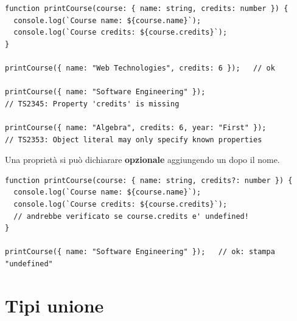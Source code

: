 \begin{affianco}[0.6][c]
\codicepiccolo
\begin{lstlisting}[style=ts, name=object_types.ts]
function printCourse(course: { name: string, credits: number }) {
  console.log(`Course name: ${course.name}`);
  console.log(`Course credits: ${course.credits}`);
}

printCourse({ name: "Web Technologies", credits: 6 });   // ok

printCourse({ name: "Software Engineering" });
// TS2345: Property 'credits' is missing

printCourse({ name: "Algebra", credits: 6, year: "First" });
// TS2353: Object literal may only specify known properties
\end{lstlisting}
\risultato
\begin{immagine}
\end{immagine}
\end{affianco}

Una proprietà si può dichiarare \textbf{opzionale} aggiungendo un  dopo
il nome.

\begin{lstlisting}[style=ts]
function printCourse(course: { name: string, credits?: number }) {
  console.log(`Course name: ${course.name}`);
  console.log(`Course credits: ${course.credits}`);
  // andrebbe verificato se course.credits e' undefined!
}

printCourse({ name: "Software Engineering" });   // ok: stampa "undefined"
\end{lstlisting}

\section{Tipi unione}

